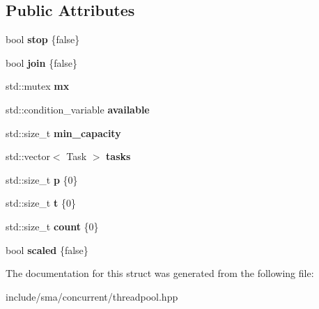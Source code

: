 \subsection*{Public Attributes}
\begin{DoxyCompactItemize}
\item 
\hypertarget{structsma_1_1Threadpool_1_1shared__state_a92d1376a736b9f8aa9d9e3503b5fe48f}{bool {\bfseries stop} \{false\}}\label{structsma_1_1Threadpool_1_1shared__state_a92d1376a736b9f8aa9d9e3503b5fe48f}

\item 
\hypertarget{structsma_1_1Threadpool_1_1shared__state_a9e7111c1a17dac445a03f0b2f97affed}{bool {\bfseries join} \{false\}}\label{structsma_1_1Threadpool_1_1shared__state_a9e7111c1a17dac445a03f0b2f97affed}

\item 
\hypertarget{structsma_1_1Threadpool_1_1shared__state_a62f2482b1680b8e58335c722233d10d2}{std\-::mutex {\bfseries mx}}\label{structsma_1_1Threadpool_1_1shared__state_a62f2482b1680b8e58335c722233d10d2}

\item 
\hypertarget{structsma_1_1Threadpool_1_1shared__state_adf4fd2662e28fc0036466475d3ac0bd3}{std\-::condition\-\_\-variable {\bfseries available}}\label{structsma_1_1Threadpool_1_1shared__state_adf4fd2662e28fc0036466475d3ac0bd3}

\item 
\hypertarget{structsma_1_1Threadpool_1_1shared__state_ab2387d81e2df090c9ef6e4b7f13ea7a2}{std\-::size\-\_\-t {\bfseries min\-\_\-capacity}}\label{structsma_1_1Threadpool_1_1shared__state_ab2387d81e2df090c9ef6e4b7f13ea7a2}

\item 
\hypertarget{structsma_1_1Threadpool_1_1shared__state_a99814a6f7a34442b33c0a3a29c232991}{std\-::vector$<$ Task $>$ {\bfseries tasks}}\label{structsma_1_1Threadpool_1_1shared__state_a99814a6f7a34442b33c0a3a29c232991}

\item 
\hypertarget{structsma_1_1Threadpool_1_1shared__state_ae855d4a68a5be30cbfeeb795774defaa}{std\-::size\-\_\-t {\bfseries p} \{0\}}\label{structsma_1_1Threadpool_1_1shared__state_ae855d4a68a5be30cbfeeb795774defaa}

\item 
\hypertarget{structsma_1_1Threadpool_1_1shared__state_a752c7672ae12648560bf94eab73fda18}{std\-::size\-\_\-t {\bfseries t} \{0\}}\label{structsma_1_1Threadpool_1_1shared__state_a752c7672ae12648560bf94eab73fda18}

\item 
\hypertarget{structsma_1_1Threadpool_1_1shared__state_a83b195a4c66142d9b1584092683d96e4}{std\-::size\-\_\-t {\bfseries count} \{0\}}\label{structsma_1_1Threadpool_1_1shared__state_a83b195a4c66142d9b1584092683d96e4}

\item 
\hypertarget{structsma_1_1Threadpool_1_1shared__state_af5170874b5b399de9878f4143b3543f9}{bool {\bfseries scaled} \{false\}}\label{structsma_1_1Threadpool_1_1shared__state_af5170874b5b399de9878f4143b3543f9}

\end{DoxyCompactItemize}


The documentation for this struct was generated from the following file\-:\begin{DoxyCompactItemize}
\item 
include/sma/concurrent/threadpool.\-hpp\end{DoxyCompactItemize}
